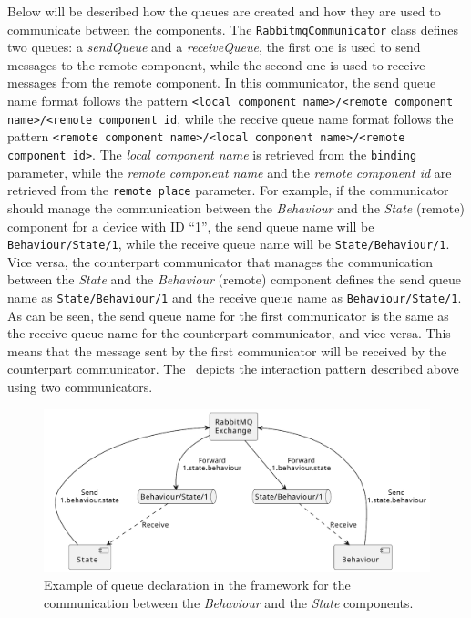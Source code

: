 Below will be described how the queues are created and how they are used to communicate between the components.
The \texttt{RabbitmqCommunicator} class defines two queues: a \emph{sendQueue} and a \emph{receiveQueue}, the first one is used to send messages to
the remote component, while the second one is used to receive messages from the remote component.
In this communicator, the send queue name format follows the pattern \texttt{<local component name>/<remote component name>/<remote component id},
while the receive queue name format follows the pattern \texttt{<remote component name>/<local component name>/<remote component id>}.
The \emph{local component name} is retrieved from the \texttt{binding} parameter, while the \emph{remote component name} and the
\emph{remote component id} are retrieved from the \texttt{remote place} parameter.
For example, if the communicator should manage the communication between the \emph{Behaviour} and the \emph{State} (remote) component for a device
with ID ``1'', the send queue name will be \texttt{Behaviour/State/1}, while the receive queue name will be \texttt{State/Behaviour/1}.
Vice versa, the counterpart communicator that manages the communication between the \emph{State} and the \emph{Behaviour} (remote) component
defines the send queue name as \texttt{State/Behaviour/1} and the receive queue name as \texttt{Behaviour/State/1}.
As can be seen, the send queue name for the first communicator is the same as the receive queue name for the counterpart communicator, and vice versa.
This means that the message sent by the first communicator will be received by the counterpart communicator.
The~ depicts the interaction pattern described above using two communicators.

\begin{figure}[ht]
	\centering
	\includegraphics[width=\textwidth]{figures/rabbitmq-queue.pdf}
	\caption[Example of queue declaration in the framework]{Example of queue declaration in the framework for the communication between the \emph{Behaviour} and the \emph{State} components.}
	\label{fig:rabbitmq-queues}
\end{figure}

